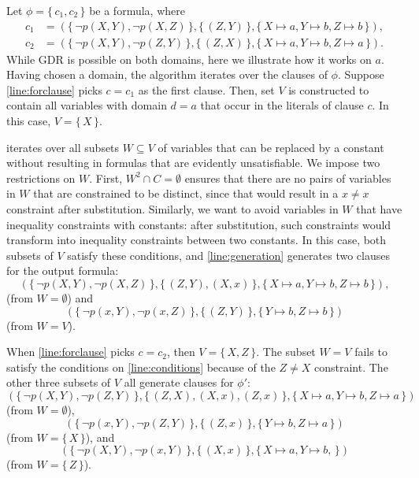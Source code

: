 
\begin{example}
  Let $\phi = \{\, c_1, c_2 \,\}$ be a formula, where
  \begin{align*}
    c_1 &= (\{\, \neg p(X, Y), \neg p(X, Z) \,\}, \{\, (Z, Y) \,\}, \{\, X \mapsto a, Y \mapsto b, Z \mapsto b \,\}), \\
    c_2 &= (\{\, \neg p(X, Y), \neg p(Z, Y) \,\}, \{\, (Z, X) \,\}, \{\, X \mapsto a, Y \mapsto b, Z \mapsto a \,\}).
  \end{align*}
  While GDR is possible on both domains, here we illustrate how it works on $a$.
  Having chosen a domain, the algorithm iterates over the clauses of $\phi$.
  Suppose \cref{line:forclause} picks $c = c_1$ as the first clause. Then, set
  $V$ is constructed to contain all variables with domain $d = a$ that occur in
  the literals of clause $c$. In this case, $V = \{\, X \,\}$.

   iterates over all subsets $W \subseteq V$ of variables
  that can be replaced by a constant without resulting in formulas that are
  evidently unsatisfiable. We impose two restrictions on $W$. First,
  $W^2 \cap C = \emptyset$ ensures that there are no pairs of variables in $W$
  that are constrained to be distinct, since that would result in a $x \ne x$
  constraint after substitution. Similarly, we want to avoid variables in $W$
  that have inequality constraints with constants: after substitution, such
  constraints would transform into inequality constraints between two constants.
  In this case, both subsets of $V$ satisfy these conditions, and
  \cref{line:generation} generates two clauses for the output formula:
  \[
    (\{\, \neg p(X, Y), \neg p(X, Z) \,\}, \{\, (Z, Y), (X, x) \,\}, \{\, X \mapsto a, Y \mapsto b, Z \mapsto b \,\}),
  \]
  (from $W = \emptyset$) and
  \[
    (\{\, \neg p(x, Y), \neg p(x, Z) \,\}, \{\, (Z, Y) \,\}, \{\, Y \mapsto b, Z \mapsto b \,\})
  \]
  (from $W = V$).

  When \cref{line:forclause} picks $c = c_2$, then $V = \{\, X, Z \,\}$. The
  subset $W = V$ fails to satisfy the conditions on \cref{line:conditions}
  because of the $Z \ne X$ constraint. The other three subsets of $V$ all
  generate clauses for $\phi'$:
  \[
    (\{\, \neg p(X, Y), \neg p(Z, Y) \,\}, \{\, (Z, X), (X, x), (Z, x) \,\}, \{\, X \mapsto a, Y \mapsto b, Z \mapsto a \,\})
  \]
  (from $W = \emptyset$),
  \[
    (\{\, \neg p(x, Y), \neg p(Z, Y) \,\}, \{\, (Z, x) \,\}, \{\, Y \mapsto b, Z \mapsto a \,\})
  \]
  (from $W = \{\, X \,\}$), and
  \[
    (\{\, \neg p(X, Y), \neg p(x, Y) \,\}, \{\, (X, x) \,\}, \{\, X \mapsto a, Y \mapsto b, \,\})
  \]
  (from $W = \{\, Z \,\}$).
\end{example}

